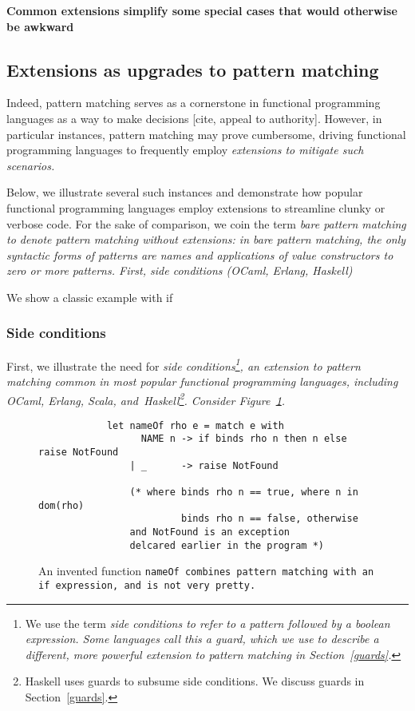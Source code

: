 \documentclass[manuscript,screen,review, 12pt]{acmart}
\begin{document}
\begin{outline}[enumerate]
    \1 \bf{Common extensions simplify some special cases that would otherwise be awkward}
\subsection{Extensions as upgrades to pattern matching}

    Indeed, pattern matching serves as a cornerstone in functional programming
    languages as a way to make decisions [cite, appeal to authority]. However,
    in particular instances, pattern matching may prove cumbersome, driving
    functional programming languages to frequently employ \it{extensions} to mitigate such
    scenarios. 
    
    Below, we illustrate several such instances and demonstrate how popular
    functional programming languages employ extensions to streamline clunky or verbose code.
    For the sake of comparison, we coin the term \it{bare pattern matching} to
    denote pattern matching \it{without} extensions: in bare pattern matching,
    the only syntactic forms of patterns are names and applications of value
    constructors to zero or more patterns. 
    \2 First, side conditions (OCaml, Erlang, Haskell)

    \3 We show a classic example with if 

\subsubsection{Side conditions}

    First, we illustrate the need for \it{side conditions}\footnote{We use the
    term \it{side conditions} to refer to a pattern followed by a boolean
    expression. Some languages call this a \it{guard}, which we use to describe
    a different, more powerful extension to pattern matching in
    Section~\ref{guards}.}, an extension to pattern matching common in most
    popular functional programming languages, including OCaml, Erlang, Scala,
    and~Haskell\footnote{Haskell uses guards to subsume side conditions. We
    discuss guards in Section~\ref{guards}.}. Consider
    Figure~\ref{fig:ifnameof}. 
    
    \begin{figure}[ht]
        \begin{verbatim}
            let nameOf rho e = match e with 
                  NAME n -> if binds rho n then n else raise NotFound
                | _      -> raise NotFound  

                (* where binds rho n == true, where n in dom(rho)
                         binds rho n == false, otherwise
                and NotFound is an exception 
                delcared earlier in the program *)
            \end{verbatim}    
        \caption{An invented function \tt{nameOf} combines pattern matching with
        an \tt{if} expression, and is not very pretty.}    
        \label{fig:ifnameof}
    \end{figure}
    

\end{outline}
\end{document}
